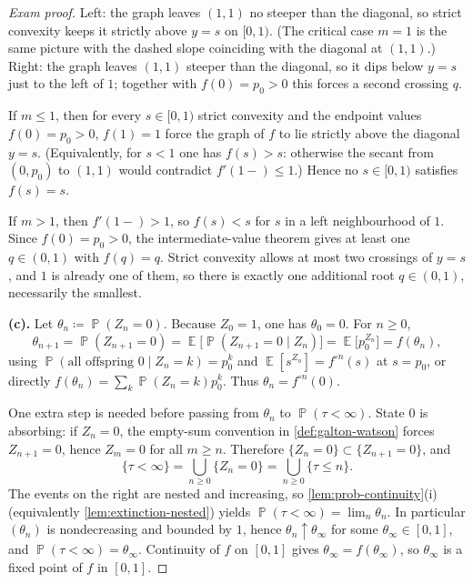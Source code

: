 \documentclass[11pt,a4paper]{article}
\DeclareMathOperator{\E}{\mathbb{E}}
\DeclareMathOperator{\Pbb}{\mathbb{P}}
\begin{document}
\begin{proof}[Exam proof]
Left: the graph leaves \((1,1)\) no steeper than the diagonal, so strict convexity keeps it strictly above \(y=s\) on \([0,1)\). (The critical case \(m=1\) is the same picture with the dashed slope coinciding with the diagonal at \((1,1)\).) Right: the graph leaves \((1,1)\) steeper than the diagonal, so it dips below \(y=s\) just to the left of \(1\); together with \(f(0)=p_0>0\) this forces a second crossing \(q\).

If \(m\le 1\), then for every \(s\in[0,1)\) strict convexity and the endpoint values \(f(0)=p_0>0\), \(f(1)=1\) force the graph of \(f\) to lie strictly above the diagonal \(y=s\). (Equivalently, for \(s<1\) one has \(f(s)>s\): otherwise the secant from \((0,p_0)\) to \((1,1)\) would contradict \(f'(1-)\le 1\).) Hence no \(s\in[0,1)\) satisfies \(f(s)=s\).

If \(m>1\), then \(f'(1-)>1\), so \(f(s)<s\) for \(s\) in a left neighbourhood of \(1\). Since \(f(0)=p_0>0\), the intermediate-value theorem gives at least one \(q\in(0,1)\) with \(f(q)=q\). Strict convexity allows at most two crossings of \(y=s\), and \(1\) is already one of them, so there is exactly one additional root \(q\in(0,1)\), necessarily the smallest.

\textbf{(c).}
Let \(\theta_n\coloneqq\Pbb(Z_n=0)\). Because \(Z_0=1\), one has \(\theta_0=0\). For \(n\ge 0\),
\[
\theta_{n+1}
=
\Pbb(Z_{n+1}=0)
=
\E\bigl[\Pbb(Z_{n+1}=0\mid Z_n)\bigr]
=
\E\bigl[p_0^{Z_n}\bigr]
=
f(\theta_n),
\]
using \(\Pbb(\text{all offspring }0\mid Z_n=k)=p_0^k\) and \(\E[s^{Z_n}]=f^{\circ n}(s)\) at \(s=p_0\), or directly \(f(\theta_n)=\sum_k \Pbb(Z_n=k)p_0^k\). Thus \(\theta_n=f^{\circ n}(0)\).

One extra step is needed before passing from \(\theta_n\) to \(\Pbb(\tau<\infty)\). State \(0\) is absorbing: if \(Z_n=0\), the empty-sum convention in \cref{def:galton-watson} forces \(Z_{n+1}=0\), hence \(Z_m=0\) for all \(m\ge n\). Therefore \(\{Z_n=0\}\subset\{Z_{n+1}=0\}\), and
\[
\{\tau<\infty\}
=
\bigcup_{n\ge 0}\{Z_n=0\}
=
\bigcup_{n\ge 0}\{\tau\le n\}.
\]
The events on the right are nested and increasing, so \cref{lem:prob-continuity}(i) (equivalently \cref{lem:extinction-nested}) yields \(\Pbb(\tau<\infty)=\lim_n\theta_n\). In particular \((\theta_n)\) is nondecreasing and bounded by \(1\), hence \(\theta_n\uparrow \theta_\infty\) for some \(\theta_\infty\in[0,1]\), and \(\Pbb(\tau<\infty)=\theta_\infty\). Continuity of \(f\) on \([0,1]\) gives \(\theta_\infty=f(\theta_\infty)\), so \(\theta_\infty\) is a fixed point of \(f\) in \([0,1]\).


\end{proof}
\end{document}
